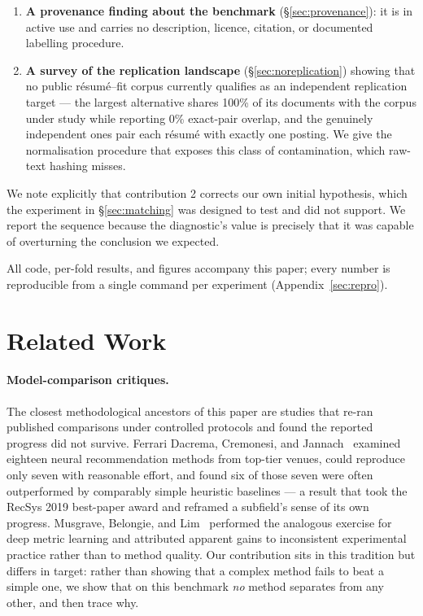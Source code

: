 \documentclass[11pt]{article}                      %
\begin{document}
\begin{enumerate}
\item \textbf{A provenance finding about the benchmark}
(\S\ref{sec:provenance}): it is in active use and carries no description,
licence, citation, or documented labelling procedure.

\item \textbf{A survey of the replication landscape}
(\S\ref{sec:noreplication}) showing that no public résumé--fit corpus currently
qualifies as an independent replication target --- the largest alternative shares
100\% of its documents with the corpus under study while reporting 0\% exact-pair
overlap, and the genuinely independent ones pair each résumé with exactly one
posting. We give the normalisation procedure that exposes this class of
contamination, which raw-text hashing misses.
\end{enumerate}

We note explicitly that contribution 2 corrects our own initial hypothesis, which
the experiment in \S\ref{sec:matching} was designed to test and did not support.
We report the sequence because the diagnostic's value is precisely that it was
capable of overturning the conclusion we expected.

All code, per-fold results, and figures accompany this paper; every number is
reproducible from a single command per experiment (Appendix~\ref{sec:repro}).

\section{Related Work}

\paragraph{Model-comparison critiques.}
The closest methodological ancestors of this paper are studies that re-ran
published comparisons under controlled protocols and found the reported progress
did not survive. Ferrari Dacrema, Cremonesi, and
Jannach~\cite{dacrema2019progress} examined eighteen neural recommendation
methods from top-tier venues, could reproduce only seven with reasonable effort,
and found six of those seven were often outperformed by comparably simple
heuristic baselines --- a result that took the RecSys 2019 best-paper award and
reframed a subfield's sense of its own progress. Musgrave, Belongie, and
Lim~\cite{musgrave2020reality} performed the analogous exercise for deep metric
learning and attributed apparent gains to inconsistent experimental practice
rather than to method quality. Our contribution sits in this tradition but
differs in target: rather than showing that a complex method fails to beat a
simple one, we show that on this benchmark \emph{no} method separates from any
other, and then trace why.
\end{document}
